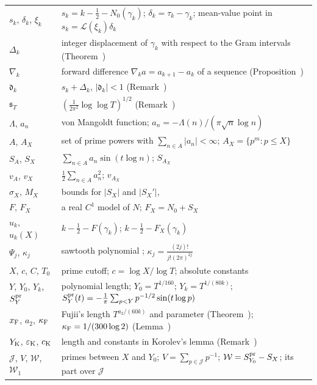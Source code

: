 \documentclass[preprint,12pt]{elsarticle}
\makeatletter
\let\CG@origref\ref
\let\CG@origeqref\eqref
\newcommand{\CG@gettip}[1]{\@ifundefined{CGTip@#1}{Reference: #1}{\csname CGTip@#1\endcsname}}
\DeclareRobustCommand{\CGref}[1]{\pdftooltip{\CG@origref{#1}}{\CG@gettip{#1}}}
\DeclareRobustCommand{\CGeqref}[1]{\pdftooltip{\CG@origeqref{#1}}{\CG@gettip{#1}}}
\numberwithin{equation}{section}
\theoremstyle{plain}
\theoremstyle{definition}
\theoremstyle{remark}
\newcommand{\NO}{N_0}
\newcommand{\lL}{\mathcal L}
\makeatother
\begin{document}
\begin{center}
\begin{longtable}{p{}p{}}
$s_k$, $\delta_k$, $\xi_k$ & $s_k=k-\frac12-\NO(\gamma_k)$; $\delta_k=\tau_k-\gamma_k$; mean-value point in $s_k=\lL(\xi_k)\delta_k$\\
$\Delta_k$ & integer displacement of $\gamma_k$ with respect to the Gram intervals (Theorem~\CGref{thm:known_korolev})\\
$\nabla_k$ & forward difference $\nabla_ka=a_{k+1}-a_k$ of a sequence (Proposition~\CGref{prop:deformation})\\
$\mathfrak d_k$ & $s_k+\Delta_k$, $|\mathfrak d_k|<1$ (Remark~\CGref{rem:korolev})\\
$\mathfrak s_T$ & $(\frac1{2\pi^2}\log\log T)^{1/2}$ (Remark~\CGref{rem:korolev})\\
$\Lambda$, $a_n$ & von Mangoldt function; $a_n=-\Lambda(n)/(\pi\sqrt n\log n)$\\
$A$, $A_X$ & set of prime powers with $\sum_{n\in A}|a_n|<\infty$; $A_X=\{p^m:p\le X\}$\\
$S_A$, $S_X$ & $\sum_{n\in A}a_n\sin(t\log n)$; $S_{A_X}$\\
$v_A$, $v_X$ & $\frac12\sum_{n\in A}a_n^2$; $v_{A_X}$\\
$\sigma_X$, $M_X$ & bounds for $|S_X|$ and $|S_X'|$, \CGeqref{eq:sigma_M_def}\\
$F$, $F_X$ & a real $C^1$ model of $N$; $F_X=\NO+S_X$\\
$u_k$, $u_k(X)$ & $k-\frac12-F(\gamma_k)$; $k-\frac12-F_X(\gamma_k)$\\
$\Psi_j$, $\kappa_j$ & sawtooth polynomial \CGeqref{eq:Psi_def}; $\kappa_j=\frac{(2j)!}{j!(2\pi)^{2j}}$\\
$X$, $c$, $C$, $T_0$ & prime cutoff; $c=\log X/\log T$; absolute constants\\
$Y$, $Y_0$, $Y_k$, $S^{\rm pr}_Y$ & polynomial length; $Y_0=T^{1/160}$; $Y_k=T^{1/(80k)}$; $S^{\rm pr}_Y(t)=-\frac1\pi\sum_{p<Y}p^{-1/2}\sin(t\log p)$\\
$x_{\rm F}$, $a_2$, $\kappa_{\rm F}$ & Fujii's length $T^{a_2/(60k)}$ and parameter (Theorem~\CGref{thm:known_fujii_selberg}); $\kappa_{\rm F}=1/(300\log2)$ (Lemma~\CGref{lem:selberg_uniform})\\
$Y_{\rm K}$, $\varepsilon_{\rm K}$, $c_{\rm K}$ & length and constants in Korolev's lemma (Remark~\CGref{rem:korolev_uniform})\\
$\mathcal J$, $V$, $\mathcal W$, $\mathcal W_1$ & primes between $X$ and $Y_0$; $V=\sum_{p\in\mathcal J}p^{-1}$; $\mathcal W=S^{\rm pr}_{Y_0}-S_X$; its part over $\mathcal J$ \CGeqref{eq:D_def}\\

\end{longtable}
\end{center}
\end{document}
